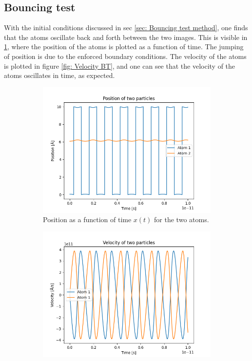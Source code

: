 \documentclass[a4paper]{article}
\begin{document}
\subsection{Bouncing test}\label{sec: Bouncing test}
With the initial conditions discussed in sec \ref{sec: Bouncing test method}, one finds that the atoms oscillate back and forth between the two images. This is visible in \ref{fig: Position BT}, where the position of the atoms is plotted as a function of time.
The jumping of position is due to the enforced boundary conditions. The velocity of the atoms is plotted in figure \ref{fig: Velocity BT}, and one can see that the velocity of the atoms oscillates in time, as expected.
\begin{figure}[H]
    \centering
    \begin{subfigure}[b]{0.45\textwidth}
        \centering
        \includegraphics[width=\textwidth]{bsX.png}
        \caption{Position as a function of time $x(t)$ for the two atoms.}
        \label{fig: Position BT}
    \end{subfigure}
    \hfill
    \begin{subfigure}[b]{0.45\textwidth}
        \centering
        \includegraphics[width=\textwidth]{bsV.png}

\end{subfigure}
\end{figure}
\end{document}
